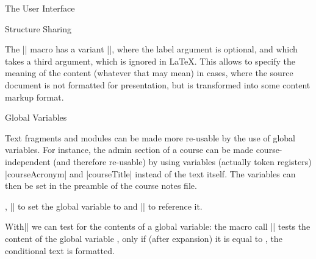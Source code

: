 \begin{sfragment}[id=sec:user]{The User Interface}
\begin{sfragment}[id=sec:user:sharing]{Structure Sharing}
\begin{function}{\STRsemantics}
  The |\STRlabel| macro has a variant |\STRsemantics|, where the label argument is
  optional, and which takes a third argument, which is ignored in {\LaTeX}. This allows to
  specify the meaning of the content (whatever that may mean) in cases, where the source
  document is not formatted for presentation, but is transformed into some content markup
  format.
\end{function}
\end{sfragment}

\begin{sfragment}[id=sec:user:gvars]{Global Variables}

  Text fragments and modules can be made more re-usable by the use of global
  variables. For instance, the admin section of a course can be made course-independent
  (and therefore re-usable) by using variables (actually token registers)
  |courseAcronym| and |courseTitle| instead of the text itself. The variables can then
  be set in the \sTeX preamble of the course notes file.
  
  \begin{function}{\setSGvar,\useSGvar}
    || to set the global variable  to
     and || to reference it.
  \end{function}
  
  \begin{function}{\ifSGvar}
    With|\ifSGvar| we can test for the contents of a global variable: the macro call
    || tests the content of the
    global variable , only if (after expansion) it is equal to , the
    conditional text  is formatted.
  \end{function}
\end{sfragment}
\end{sfragment}


